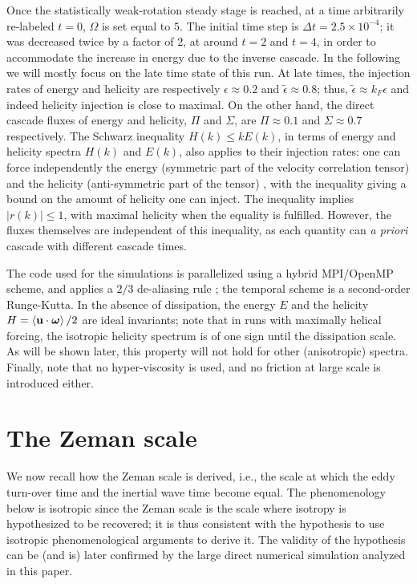 \documentclass[aps,amsmath,amssymb,floatfix,showpacs]{revtex4}
\begin{document}
Once the statistically weak-rotation steady stage is reached, at a time arbitrarily re-labeled $t=0$, $\Omega$ is set equal to $5$. The initial time step is $\Delta t = 2.5 \times 10^{-4}$; it was decreased twice by a factor of $2$, at around $t=2$ and $ t=4$, in order to accommodate the increase in energy due to the inverse cascade. In the following we will mostly focus on the late time state of this run. At late times, the injection rates of energy and helicity are respectively $\epsilon \approx 0.2$ and $\tilde \epsilon \approx 0.8$; thus, $\tilde \epsilon \approx k_F \epsilon$ and indeed helicity injection is close to maximal. On the other hand, the direct cascade fluxes of energy and helicity, $\Pi$ and $\Sigma$, are $\Pi \approx 0.1$ and $\Sigma \approx 0.7$ respectively. The Schwarz inequality $H(k)\le kE(k)$, in terms of energy and helicity spectra $H(k)$ and $E(k)$, also applies to their injection rates: one can force independently the energy (symmetric part of the velocity correlation tensor) and the helicity (anti-symmetric part of the tensor) \citep[see, e.g.,][]{pouquet_patterson}, with the inequality giving a bound on the amount of helicity one can inject. The inequality implies $|r(k)| \le 1$, with maximal helicity when the equality is fulfilled. However, the fluxes themselves are independent of this inequality, as each quantity can {\it a priori} cascade with different cascade times.

The code used for the simulations is parallelized using a hybrid MPI/OpenMP scheme, and applies a $2/3$ de-aliasing rule \citep{ghybrid, Gomez05a}; the temporal scheme is a second-order Runge-Kutta. In the absence of dissipation, the energy $E$ and the helicity $H=\left<{\bf u} \cdot \mbox{\boldmath $\omega$} \right>/2$ are ideal invariants; note that in runs with maximally helical forcing, the isotropic helicity spectrum is of one sign until the dissipation scale. As will be shown later, this property will not hold for other (anisotropic) spectra. Finally, note that no hyper-viscosity is used, and no friction at large scale is introduced either.

\section{The Zeman scale}\label{s:aniso2}

We now recall how the Zeman scale is derived, i.e., the scale at which the eddy turn-over time and the inertial wave time become equal. The phenomenology below is isotropic since the Zeman scale is the scale where isotropy is hypothesized to be recovered; it is thus consistent with the hypothesis to use isotropic phenomenological arguments to derive it. The validity of the hypothesis can be (and is) later confirmed by the large direct numerical simulation analyzed in this paper.
\end{document}
